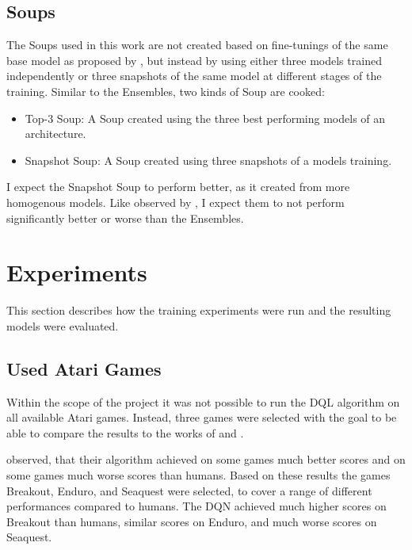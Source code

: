 \section{Soups}

The Soups used in this work are not created based on fine-tunings of the same base model as proposed by \textcite{wortsman_model_2022}, but instead by using either three models trained independently or three snapshots of the same model at different stages of the training. Similar to the Ensembles, two kinds of Soup are cooked:

\begin{itemize}
	\item Top-3 Soup: A Soup created using the three best performing models of an architecture.
	\item Snapshot Soup: A Soup created using three snapshots of a models training.
\end{itemize}

I expect the Snapshot Soup to perform better, as it created from more homogenous models. Like observed by \textcite{wortsman_model_2022}, I expect them to not perform significantly better or worse than the Ensembles.

\chapter{Experiments}

This section describes how the training experiments were run and the resulting models were evaluated.

\section{Used Atari Games}

Within the scope of the project it was not possible to run the DQL algorithm on all available Atari games. Instead, three games were selected with the goal to be able to compare the results to the works of \textcite{mnih_playing_2013} and \textcite{mnih_human-level_2015}.

\textcite{mnih_playing_2013} observed, that their algorithm achieved on some games much better scores and on some games much worse scores than humans. Based on these results the games Breakout, Enduro, and Seaquest were selected, to cover a range of different performances compared to humans. The DQN achieved much higher scores on Breakout than humans, similar scores on Enduro, and much worse scores on Seaquest.

